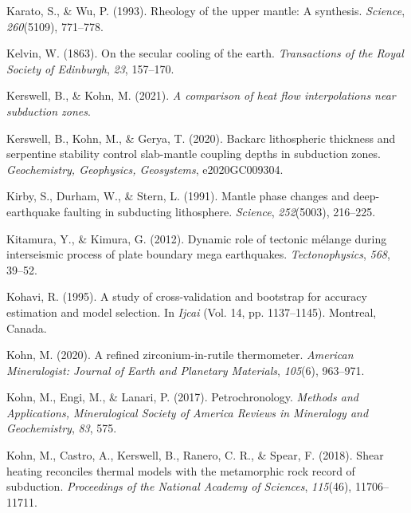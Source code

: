 \begin{CSLReferences}{1}{1}
\leavevmode{}%
Karato, S., \& Wu, P. (1993). Rheology of the upper mantle: A synthesis. \emph{Science}, \emph{260}(5109), 771--778.

\leavevmode{}%
Kelvin, W. (1863). On the secular cooling of the earth. \emph{Transactions of the Royal Society of Edinburgh}, \emph{23}, 157--170.

\leavevmode{}%
Kerswell, B., \& Kohn, M. (2021). \emph{A comparison of heat flow interpolations near subduction zones}.

\leavevmode{}%
Kerswell, B., Kohn, M., \& Gerya, T. (2020). Backarc lithospheric thickness and serpentine stability control slab-mantle coupling depths in subduction zones. \emph{Geochemistry, Geophysics, Geosystems}, e2020GC009304.

\leavevmode{}%
Kirby, S., Durham, W., \& Stern, L. (1991). Mantle phase changes and deep-earthquake faulting in subducting lithosphere. \emph{Science}, \emph{252}(5003), 216--225.

\leavevmode{}%
Kitamura, Y., \& Kimura, G. (2012). Dynamic role of tectonic m{é}lange during interseismic process of plate boundary mega earthquakes. \emph{Tectonophysics}, \emph{568}, 39--52.

\leavevmode{}%
Kohavi, R. (1995). A study of cross-validation and bootstrap for accuracy estimation and model selection. In \emph{Ijcai} (Vol. 14, pp. 1137--1145). Montreal, Canada.

\leavevmode{}%
Kohn, M. (2020). A refined zirconium-in-rutile thermometer. \emph{American Mineralogist: Journal of Earth and Planetary Materials}, \emph{105}(6), 963--971.

\leavevmode{}%
Kohn, M., Engi, M., \& Lanari, P. (2017). Petrochronology. \emph{Methods and Applications, Mineralogical Society of America Reviews in Mineralogy and Geochemistry}, \emph{83}, 575.

\leavevmode{}%
Kohn, M., Castro, A., Kerswell, B., Ranero, C. R., \& Spear, F. (2018). Shear heating reconciles thermal models with the metamorphic rock record of subduction. \emph{Proceedings of the National Academy of Sciences}, \emph{115}(46), 11706--11711.


\end{CSLReferences}
